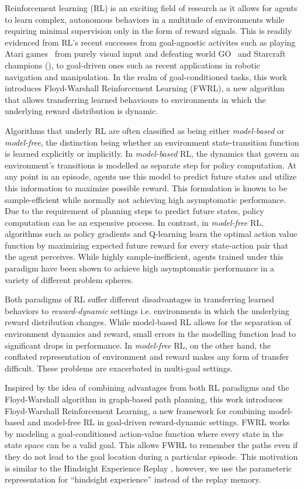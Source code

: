 Reinforcement learning (RL) is an exciting field of research as it allows
for agents to learn complex, autonomous behaviors in a multitude of
environments while requiring minimal supervision only in the form of reward
signals. This is readily evidenced from RL's recent successes from goal-agnostic
activites such as playing Atari games~\cite{MnKaSiNATURE2015} from purely visual
input and defeating world GO~\cite{gibney2016google} and Starcraft champions
(), to
goal-driven ones such as recent applications in robotic navigation and
manipulation. In the realm of goal-conditioned tasks, this
work introduces Floyd-Warshall Reinforcement Learning (FWRL), a new algorithm
that allows transferring learned behaviours to environments in which the
underlying reward distribution is dynamic.

Algorithms that underly RL are often classified as being either
\emph{model-based} or \emph{model-free}, the distinction being whether
an environment state-transition function is learned explicitly or
implicitly.  In \emph{model-based} RL, the dynamics that govern an
environment's transitions is modelled as separate step for policy
computation. At any point in an episode, agents use this model to
predict future states and utilize this information to maximize possible
reward. This formulation is known to be sample-efficient while normally
not achieving high asymptomatic performance.  Due to the requirement of
planning steps to predict future states, policy computation can be an
expensive process. In contrast, in \emph{model-free} RL, algorithms such
as policy gradients and Q-learning learn the optimal action value
function by maximizing expected future reward for every state-action
pair that the agent perceives.  While highly sample-inefficient, agents
trained under this paradigm have been shown to achieve high asymptomatic
performance in a variety of different problem spheres.

Both paradigms of RL suffer different disadvantages in transferring
learned behaviors to \emph{reward-dynamic} settings i.e.  environments
in which the underlying reward distribution changes.  While model-based
RL allows for the separation of environment dynamics and reward, small
errors in the modelling function lead to significant drops in
performance. In \emph{model-free} RL, on the other hand, the conflated
representation of environment and reward makes any form of transfer
difficult. These problems are exacerbated in multi-goal settings. 

Inspired by the idea of combining advantages from both RL paradigms and
the Floyd-Warshall algorithm in graph-based path planning, this work
introduces Floyd-Warshall Reinforcement Learning, a new framework for
combining model-based and model-free RL in goal-driven reward-dynamic
settings. FWRL works by modeling a goal-conditioned action-value function
where every state in the state space can be a valid goal. This allows
FWRL to remember the paths even if they do not lead to the
goal location during a particular episode.
This motivation is similar to the Hindsight Experience Replay 
\cite{anderson2017vision}, however, we use the parameteric representation
for ``hindsight experience'' instead of the replay memory.

